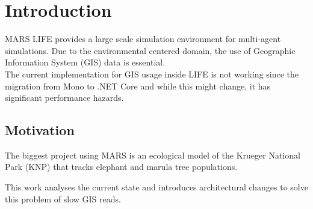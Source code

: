 
\chapter{Introduction}
MARS LIFE provides a large scale simulation environment for multi-agent simulations. Due to the environmental centered domain, the use of Geographic Information System (GIS) data is essential.\\
The current implementation for GIS usage inside LIFE is not working since the migration from Mono to .NET Core and while this might change, it has significant performance hazards.



\section{Motivation}
The biggest project using MARS is an ecological model of the Krueger National Park (KNP) that tracks elephant and marula tree populations. 

This work analyses the current state and introduces architectural changes to solve this problem of slow GIS reads.
